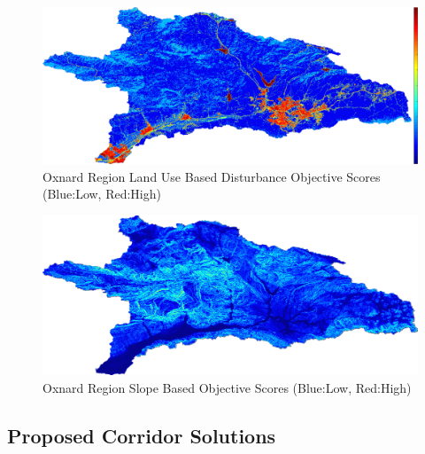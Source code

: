         \begin{figure}[!h]
            \begin{center}
            \includegraphics[width=5.5in]{figures/Oxnard_DisturbanceScore.png}   
            \caption{Oxnard Region Land Use Based Disturbance Objective Scores (Blue:Low, Red:High)}
            \label{fig:Odisturbance}
            \end{center}
        \end{figure}
        
        \begin{figure}[!h]
            \begin{center}
            \includegraphics[width=5.5in]{figures/Oxnard_SlopeScore.png}   
            \caption{Oxnard Region Slope Based Objective Scores (Blue:Low, Red:High)}
            \label{fig:Oslope}
            \end{center}
        \end{figure}
        
    \subsection{Proposed Corridor Solutions}
    
